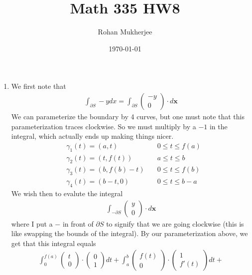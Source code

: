 \documentclass[12pt]{article}
\title{Math 335 HW8}
\date{\today}
\author{Rohan Mukherjee}
\theoremstyle{definition}
\theoremstyle{remark}
\begin{document}
	\maketitle
	\begin{enumerate}[leftmargin=\labelsep]
		\item We first note that 
		\begin{align*}
			\int_{\partial S} -ydx = \int_{\partial S} \begin{pmatrix}
				-y \\ 0
			\end{pmatrix} \cdot d\textbf{x}
		\end{align*}
		We can parameterize the boundary by 4 curves, but one must note that this parameterization traces clockwise. So we must multiply by a $-1$ in the integral, which actually ends up making things nicer.
		\begin{align*}
			&\gamma_1(t) = (a, t) &\quad 0 \leq t \leq f(a) \\
			&\gamma_2(t) = (t, f(t)) &\quad  a \leq t \leq b \\
			&\gamma_3(t) = (b, f(b)-t) &\quad  0 \leq t \leq f(b) \\
			&\gamma_4(t) = (b-t, 0) &\quad  0 \leq t \leq b-a
		\end{align*}
		We wish then to evalute the integral
		\begin{align*}
			\int_{- \partial S} \begin{pmatrix}
				y \\ 0
			\end{pmatrix} \cdot d\textbf{x}
		\end{align*}
		where I put a $-$ in front of $\partial S$ to signify that we are going clockwise (this is like swapping the bounds of the integral). By our parameterization above, we get that this integral equals
		\begin{align*}
			\int_0^{f(a)} 
			\begin{pmatrix}
				t \\ 0
			\end{pmatrix} \cdot \begin{pmatrix}
			0 \\ 1
			\end{pmatrix}dt + 
			\int_a^b \begin{pmatrix}
			f(t)\\ 0
			\end{pmatrix} \cdot \begin{pmatrix}
			1 \\ f'(t)
			\end{pmatrix}dt +

\end{align*}
\end{enumerate}
\end{document}
